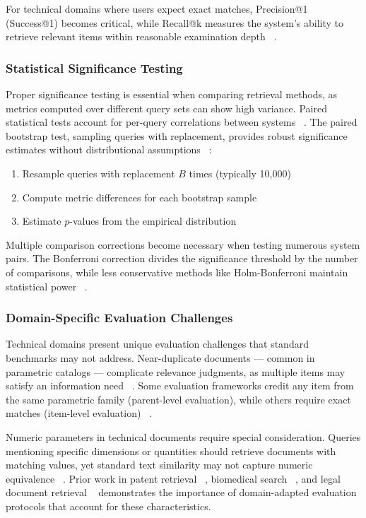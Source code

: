 \documentclass[preprint,12pt]{elsarticle}
\begin{document}
For technical domains where users expect exact matches, Precision@1 (Success@1) becomes critical, while Recall@k measures the system's ability to retrieve relevant items within reasonable examination depth ~\cite{baeza-yates_riberio-neto_1999}.

\subsubsection{Statistical Significance Testing}

Proper significance testing is essential when comparing retrieval methods, as metrics computed over different query sets can show high variance. Paired statistical tests account for per-query correlations between systems ~\cite{savoy1997statistical}. The paired bootstrap test, sampling queries with replacement, provides robust significance estimates without distributional assumptions ~\cite{smucker2007comparison}:
\begin{enumerate}
\item Resample queries with replacement $B$ times (typically 10,000)
\item Compute metric differences for each bootstrap sample
\item Estimate $p$-values from the empirical distribution
\end{enumerate}

Multiple comparison corrections become necessary when testing numerous system pairs. The Bonferroni correction divides the significance threshold by the number of comparisons, while less conservative methods like Holm-Bonferroni maintain statistical power ~\cite{carterette2012multiple}.

\subsubsection{Domain-Specific Evaluation Challenges}

Technical domains present unique evaluation challenges that standard benchmarks may not address. Near-duplicate documents --- common in parametric catalogs --- complicate relevance judgments, as multiple items may satisfy an information need ~\cite{bernstein2005redundant}. Some evaluation frameworks credit any item from the same parametric family (parent-level evaluation), while others require exact matches (item-level evaluation) ~\cite{piroi2011clef}.

Numeric parameters in technical documents require special consideration. Queries mentioning specific dimensions or quantities should retrieve documents with matching values, yet standard text similarity may not capture numeric equivalence ~\cite{sarawagi2004efficient}. Prior work in patent retrieval ~\cite{piroi2011clef}, biomedical search ~\cite{simpson2014}, and legal document retrieval ~\cite{locke2017automatic} demonstrates the importance of domain-adapted evaluation protocols that account for these characteristics.
\end{document}
